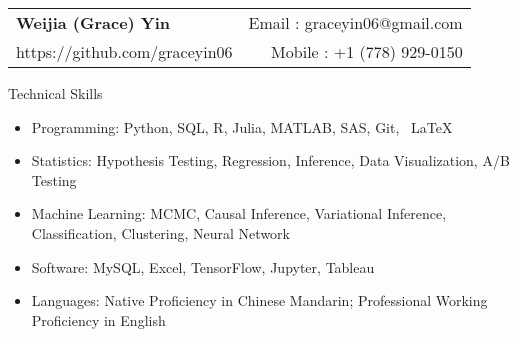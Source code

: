 \documentclass[]{resume}
\begin{document}
\begin{tabular*}{\textwidth}{l@{\extracolsep{\fill}}r}
  \textbf{\Large {Weijia (Grace) Yin}} & Email : {graceyin06@gmail.com}\\
  {https://github.com/graceyin06} & Mobile : +1 (778) 929-0150 \\
\end{tabular*}

\begin{rSection}{\sc Technical Skills}
\begin{itemize}\itemsep-0.5em 
    \item Programming: Python, SQL, R, Julia, MATLAB, SAS, Git, \ \newcommand{\latex}{\LaTeX\xspace}\latex 
    \item Statistics: Hypothesis Testing, Regression, Inference, Data Visualization, A/B Testing
    \item Machine Learning: MCMC, Causal Inference, Variational Inference, Classification, Clustering, Neural Network 
    \item Software: MySQL, Excel, TensorFlow, Jupyter, Tableau
    \item Languages: Native Proficiency in Chinese Mandarin; Professional Working Proficiency in English
\end{itemize}
\end{rSection}
\vspace{-0.7em}

\end{document}

